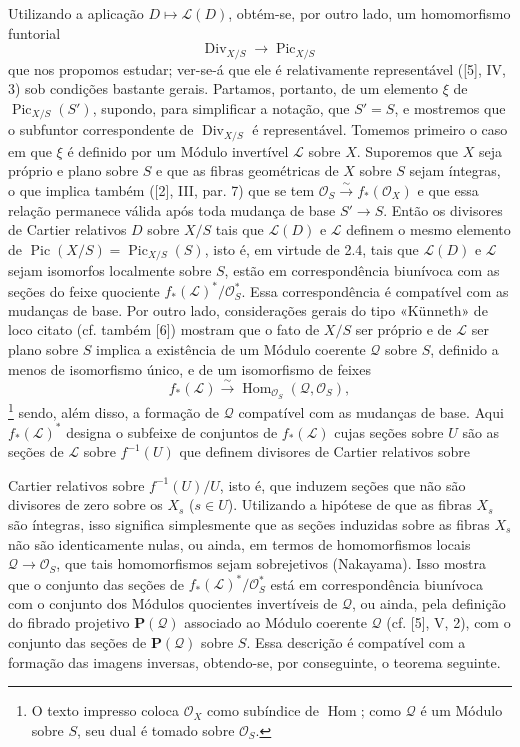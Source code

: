 \documentclass[11pt,twoside,openany]{book}
\numberwithin{equation}{section}
\newcommand{\src}[1]{%
  \phantomsection\hypertarget{src:#1}{}%
  \marginpar{\raggedleft\footnotesize\sffamily #1}%
}
\theoremstyle{plain}
\theoremstyle{definition}
\theoremstyle{remark}
\newcommand{\FgaUnitKey}{frontmatter}
\renewcommand{\src}[1]{%
  \phantomsection\hypertarget{src:\FgaUnitKey:#1}{}%
  \marginpar{\raggedleft\footnotesize\sffamily #1}%
}
\begin{document}
Utilizando a aplicação $D\longmapsto\mathcal L(D)$, obtém-se, por outro lado,
um homomorfismo funtorial
\begin{equation}
\operatorname{Div}_{X/S}\longrightarrow\operatorname{Pic}_{X/S}
\tag{+}
\end{equation}
que nos propomos estudar; ver-se-á que ele é relativamente representável ([5],
IV, 3) sob condições bastante gerais. Partamos, portanto, de um elemento $\xi$
de $\operatorname{Pic}_{X/S}(S')$, supondo, para simplificar a notação, que
$S'=S$, e mostremos que o subfuntor correspondente de
$\operatorname{Div}_{X/S}$ é representável. Tomemos primeiro o caso em que
$\xi$ é definido por um Módulo invertível $\mathcal L$ sobre $X$. Suporemos
que $X$ seja próprio e plano sobre $S$ e que as fibras geométricas de $X$
sobre $S$ sejam íntegras, o que implica também ([2], III, par. 7) que se tem
$\mathcal O_S\xrightarrow{\sim}f_*(\mathcal O_X)$ e que essa relação permanece
válida após toda mudança de base $S'\longrightarrow S$. Então os divisores de
Cartier relativos $D$ sobre $X/S$ tais que $\mathcal L(D)$ e $\mathcal L$
definem o mesmo elemento de
$\operatorname{Pic}(X/S)=\operatorname{Pic}_{X/S}(S)$, isto é, em virtude de
2.4, tais que $\mathcal L(D)$ e $\mathcal L$ sejam isomorfos localmente sobre
$S$, estão em correspondência biunívoca com as seções do feixe quociente
$f_*(\mathcal L)^*/\mathcal O_S^*$. Essa correspondência é compatível com as
mudanças de base. Por outro lado, considerações gerais do tipo «Künneth» de
loco citato (cf. também [6]) mostram que o fato de $X/S$ ser próprio e de
$\mathcal L$ ser plano sobre $S$ implica a existência de um Módulo coerente
$\mathcal Q$ sobre $S$, definido a menos de isomorfismo único, e de um
isomorfismo de feixes
\[
f_*(\mathcal L)\xrightarrow{\sim}
\operatorname{Hom}_{\mathcal O_S}(\mathcal Q,\mathcal O_S),
\]
\footnote{O texto impresso coloca $\mathcal O_X$ como subíndice de
$\operatorname{Hom}$; como $\mathcal Q$ é um Módulo sobre $S$, seu dual é
tomado sobre $\mathcal O_S$.} sendo, além disso, a formação de $\mathcal Q$
compatível com as mudanças de base. Aqui $f_*(\mathcal L)^*$ designa o
subfeixe de conjuntos de $f_*(\mathcal L)$ cujas seções sobre $U$ são as
seções de $\mathcal L$ sobre $f^{-1}(U)$ que definem divisores de Cartier
relativos sobre
\src{153}
Cartier relativos sobre $f^{-1}(U)/U$, isto é, que induzem seções que não são
divisores de zero sobre os $X_s$ ($s\in U$). Utilizando a hipótese de que as
fibras $X_s$ são íntegras, isso significa simplesmente que as seções induzidas
sobre as fibras $X_s$ não são identicamente nulas, ou ainda, em termos de
homomorfismos locais $\mathcal Q\longrightarrow\mathcal O_S$, que tais
homomorfismos sejam sobrejetivos (Nakayama). Isso mostra que o conjunto das
seções de $f_*(\mathcal L)^*/\mathcal O_S^*$ está em correspondência biunívoca
com o conjunto dos Módulos quocientes invertíveis de $\mathcal Q$, ou ainda,
pela definição do fibrado projetivo $\mathbf P(\mathcal Q)$ associado ao Módulo
coerente $\mathcal Q$ (cf. [5], V, 2), com o conjunto das seções de
$\mathbf P(\mathcal Q)$ sobre $S$. Essa descrição é compatível com a formação
das imagens inversas, obtendo-se, por conseguinte, o teorema seguinte.
\end{document}
